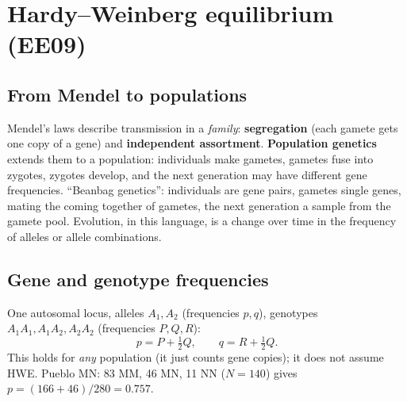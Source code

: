 \section{Hardy--Weinberg equilibrium (EE09)}

\subsection{From Mendel to populations}
Mendel's laws describe transmission in a \emph{family}: \textbf{segregation} (each gamete gets one copy of a gene) and
\textbf{independent assortment}. \textbf{Population genetics} extends them to a population: individuals make gametes,
gametes fuse into zygotes, zygotes develop, and the next generation may have different gene frequencies.
``Beanbag genetics'': individuals are gene pairs, gametes single genes, mating the coming together of gametes, the next
generation a sample from the gamete pool. Evolution, in this language, is a change over time in the frequency of alleles
or allele combinations.

\subsection{Gene and genotype frequencies}
One autosomal locus, alleles $A_1,A_2$ (frequencies $p,q$), genotypes $A_1A_1,A_1A_2,A_2A_2$ (frequencies $P,Q,R$):
\[
p=P+\tfrac12Q,\qquad q=R+\tfrac12Q .
\]
This holds for \emph{any} population (it just counts gene copies); it does not assume HWE. Pueblo MN: 83 MM, 46 MN,
11 NN ($N=140$) gives $p=(166+46)/280=0.757$.

